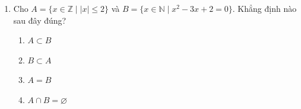 \documentclass[12pt, a4paper]{report}
\begin{document}
\begin{baitap}
\begin{enumerate}[label=\textbf{Câu \arabic*.}, leftmargin=*, itemindent=0pt]
    \item Cho \(A = \{x \in \mathbb{Z} \mid |x| \leq 2\}\) và \(B = \{x \in \mathbb{N} \mid x^2 - 3x + 2 = 0\}\). Khẳng định nào sau đây đúng?
    \begin{enumerate}[label=\Alph*.]
      \item \(A \subset B\)
      \item \(B \subset A\)
      \item \(A = B\)
      \item \(A \cap B = \varnothing\)
    \end{enumerate}
  \end{enumerate}
\end{baitap}
\end{document}
